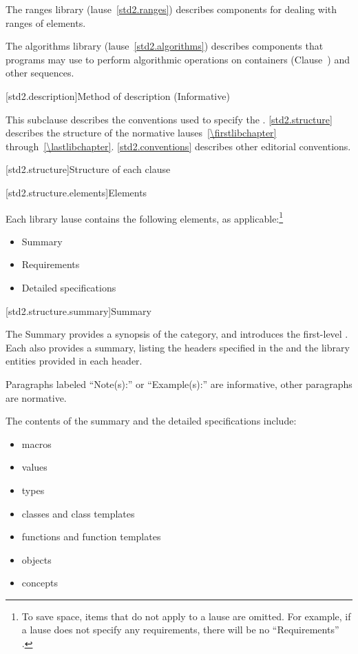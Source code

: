 \pnum
The ranges library (lause~\ref{std2.ranges}) describes components for dealing with
ranges of elements.

\pnum
The algorithms library (lause~\ref{std2.algorithms}) describes components that \Cpp
programs may use to perform algorithmic operations on containers
(Clause~) and other sequences.

[std2.description]{Method of description (Informative)}

\pnum
This subclause describes the conventions used to specify the . \ref{std2.structure} describes the structure of the normative
lauses~\ref{\firstlibchapter} through~\ref{\lastlibchapter}. \ref{std2.conventions} describes other editorial conventions.

[std2.structure]{Structure of each clause}

[std2.structure.elements]{Elements}

\pnum
Each library lause contains the following elements, as applicable:\footnote{To
save space, items that do not apply to a lause are omitted.
For example, if a lause does not specify any requirements,
there will be no ``Requirements'' .}

\begin{itemize}
\item Summary
\item Requirements
\item Detailed specifications
\end{itemize}

[std2.structure.summary]{Summary}

\pnum
The Summary provides a synopsis of the category, and introduces the first-level .
Each  also provides a summary, listing the headers specified in the
 and the library entities provided in each header.

\pnum
Paragraphs labeled ``Note(s):'' or ``Example(s):'' are informative, other paragraphs
are normative.

\pnum
The contents of the summary and the detailed specifications include:

\begin{itemize}
\item macros
\item values
\item types
\item classes and class templates
\item functions and function templates
\item objects
\item concepts
\end{itemize}

